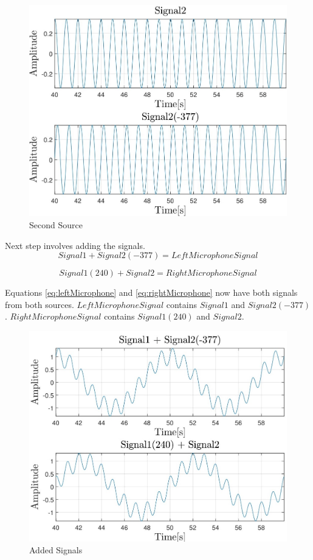 \begin{figure}[htp]
	\centering
	\includegraphics[width=\textwidth]{Illustrations/source2.jpg}
	\caption{Second Source}
	\label{fig:source2}
\end{figure}
Next step involves adding the signals.
\begin{equation}
	Signal1 + Signal2(-377) = LeftMicrophoneSignal
	\label{eq:leftMicrophone}
\end{equation}

\begin{equation}
	Signal1(240) + Signal2 = RightMicrophoneSignal
	\label{eq:rightMicrophone}
\end{equation}

Equations \ref{eq:leftMicrophone} and \ref{eq:rightMicrophone} now have both signals from both sources.
\newpage
$LeftMicrophoneSignal$ contains $Signal1$ and $Signal2(-377)$. $RightMicrophoneSignal$ contains 
$Signal1(240)$ and $Signal2$.
\begin{figure}[htp]
	\centering
	\includegraphics[width=\textwidth]{Illustrations/source1And2.jpg}
	\caption{Added Signals}
	\label{fig:source1And2}
\end{figure}

